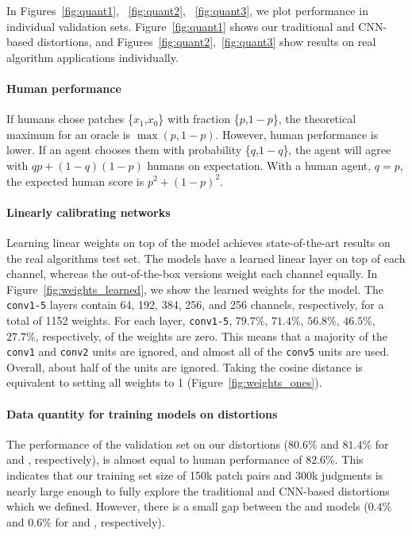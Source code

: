 In Figures~\ref{fig:quant1}, ~\ref{fig:quant2}, ~\ref{fig:quant3}, we plot performance in individual validation sets. Figure~\ref{fig:quant1} shows our traditional and CNN-based distortions, and Figures~\ref{fig:quant2},~\ref{fig:quant3} show results on real algorithm applications individually.

\paragraph{Human performance} If humans chose patches \{$x_1$,$x_0$\} with fraction \{$p$,$1-p$\}, the theoretical maximum for an oracle is $\max(p,1-p)$. However, human performance is lower. If an agent chooses them with probability \{$q$,$1-q$\}, the agent will agree with $qp + (1-q)(1-p)$ humans on expectation. With a human agent, $q=p$, the expected human score is $p^2 + (1-p)^2$.

\paragraph{Linearly calibrating networks} Learning linear weights on top of the  model achieves state-of-the-art results on the real algorithms test set. The  models have a learned linear layer on top of each channel, whereas the out-of-the-box versions weight each channel equally. In Figure~\ref{fig:weights_learned}, we show the learned weights for the  model. The \texttt{conv1-5} layers contain 64, 192, 384, 256, and 256 channels, respectively, for a total of 1152 weights. For each layer, \texttt{conv1-5}, $79.7\%$, $71.4\%$, $56.8\%$, $46.5\%$, $27.7\%$, respectively, of the weights are zero. This means that a majority of the \texttt{conv1} and \texttt{conv2} units are ignored, and almost all of the \texttt{conv5} units are used. Overall, about half of the units are ignored. Taking the cosine distance is equivalent to setting all weights to 1 (Figure~\ref{fig:weights_ones}).

\paragraph{Data quantity for training models on distortions} The performance of the validation set on our distortions ($80.6\%$ and $81.4\%$ for  and , respectively), is almost equal to human performance of $82.6\%$. This indicates that our training set size of 150k patch pairs and 300k judgments is nearly large enough to fully explore the traditional and CNN-based distortions which we defined. However, there is a small gap between the  and  models ($0.4\%$ and $0.6\%$ for  and , respectively).

